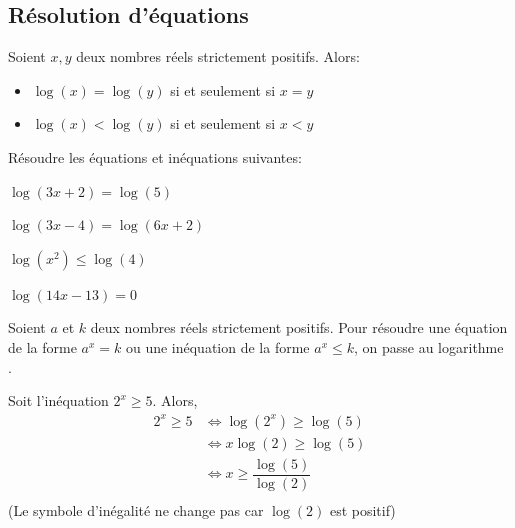 \documentclass{poly}
\begin{document}
\subsection{Résolution d'équations}
\begin{proposition}
Soient $x,y$ deux nombres réels strictement positifs. Alors:
\begin{itemize}
\item $\log(x) = \log(y)$ si et seulement si $x = y$
\item $\log(x) < \log(y)$ si et seulement si $x < y$
\end{itemize}
\end{proposition}
\begin{example}
Résoudre les équations et inéquations suivantes:
\begin{alphaquestions}
\item $\log(3x + 2) = \log(5)$
\item $\log(3x - 4) = \log(6x + 2)$
\item $\log(x^2) \leq \log(4)$
\item $\log(14x - 13) = 0$
\end{alphaquestions}
\end{example}
\begin{proposition}
Soient $a$ et $k$ deux nombres réels strictement positifs. Pour résoudre une équation de la forme $a^x = k$ ou une inéquation de la forme $a^x \leq k$, on \og passe au logarithme \fg.
\end{proposition}
\begin{example}
Soit l'inéquation $2^x \geq 5$. Alors,
\begin{equation*}
\begin{aligned}
2^x \geq 5 &\Leftrightarrow \log(2^x) \geq \log(5)\\
&\Leftrightarrow x\log(2) \geq \log(5)\\
&\Leftrightarrow x \geq \dfrac{\log(5)}{\log(2)}\\
\end{aligned}
\end{equation*}
(Le symbole d'inégalité ne change pas car $\log(2)$ est positif)
\end{example}
\end{document}
